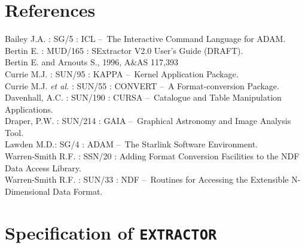 \documentclass[twoside,11pt]{article}
\newcommand{\xref}[3]{#1}
\newcommand{\xlabel}[1]{}
\renewcommand{\_}{\texttt{\symbol{95}}}
\newcommand{\EXTRACTOR}{\texttt{EXTRACTOR}}
\newcommand{\dash}{--}
\newcommand{\dash}{-}
\begin{document}
\section{\xlabel{references}References}
Bailey J.A. : \xref{SG/5}{sg5}{} : ICL \dash\ The Interactive Command Language for ADAM.\\
Bertin E. : MUD/165 : SExtractor V2.0 User's Guide (DRAFT).\\
Bertin E. and Arnouts S., 1996, A\&AS 117,393\\
Currie M.J. : \xref{SUN/95}{sun95}{} : KAPPA \dash\ Kernel Application Package.\\
Currie M.J. \textit{et al.} : \xref{SUN/55}{sun55}{} : CONVERT \dash\ A Format-conversion Package.\\
Davenhall, A.C. : \xref{SUN/190}{sun190}{} : CURSA \dash\ Catalogue and Table Manipulation Applications.\\
Draper, P.W. : \xref{SUN/214}{sun214}{} : GAIA \dash\ Graphical Astronomy and Image Analysis Tool.\\
Lawden M.D.: \xref{SG/4}{sg4}{} : ADAM \dash\ The Starlink Software Environment.\\
Warren-Smith R.F. : \xref{SSN/20}{ssn20}{} : Adding Format Conversion Facilities to the NDF Data Access Library.\\
Warren-Smith R.F. : \xref{SUN/33}{sun33}{} : NDF \dash\ Routines for Accessing the Extensible N-Dimensional Data Format.\\

\newpage
\appendix
\section{\xlabel{specification_of_extractor}Specification of \EXTRACTOR}
\end{document}

